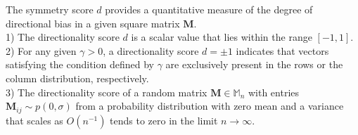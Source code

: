 \begin{proposition}
\label{prop-directionality-score}
%
The symmetry score $d$ provides a quantitative measure of the degree of directional bias in a given square matrix $\bm{M}$. \\
%
1) The directionality score $d$ is a scalar value that lies within the range  $[-1, 1]$. \\
%
2) For any given $\gamma > 0$, a directionality score $d = \pm 1$ indicates that vectors satisfying the condition defined by $\gamma$
are exclusively present in the rows or the column distribution, respectively. 
\\
3) The directionality score of a random matrix $\bm{M} \in \mathbb{M}_n$ with entries $\bm{M}_{ij} \sim p(0,\sigma)$ from a probability distribution with zero mean and a variance that scales as $O(n^{-1}) $ tends to zero in the limit $n\rightarrow\infty$.
%
\end{proposition}
